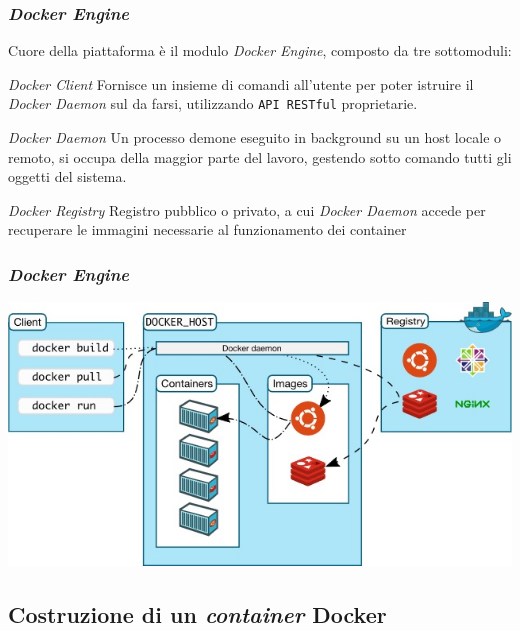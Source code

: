 \documentclass{beamer}
\begin{document}
\begin{frame}
\frametitle{ \textit{Docker Engine}}
Cuore della piattaforma è il modulo \textit{Docker Engine}, composto da tre sottomoduli:
\begin{block}{ \textit{Docker Client}}
Fornisce un insieme di comandi all’utente per poter istruire il  \textit{Docker Daemon} sul da farsi, utilizzando \texttt{API RESTful} proprietarie.
\end{block}

\begin{block}{\textit{Docker Daemon}}
Un processo demone eseguito in background su un host locale o remoto, si occupa della maggior parte del lavoro, gestendo sotto comando tutti gli oggetti del sistema.
\end{block}

\begin{block}{\textit{Docker Registry}}
Registro pubblico o privato, a cui \textit{Docker Daemon} accede per recuperare le immagini necessarie al funzionamento dei container
\end{block}
\end{frame}




\begin{frame}
\frametitle{ \textit{Docker Engine}}
\includegraphics[width=\textwidth]{pic2}
\end{frame}


\subsection{Costruzione di un \textit{container} Docker}
\end{document}
